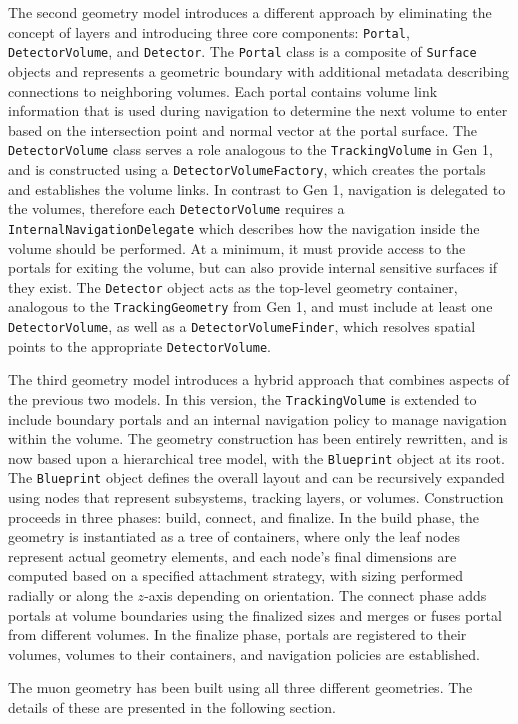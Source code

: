 The second geometry model introduces a different approach by eliminating the concept of layers and introducing three core components: \texttt{Portal}, \texttt{DetectorVolume}, and \texttt{Detector}. The \texttt{Portal} class is a composite of \texttt{Surface} objects and represents a geometric boundary with additional metadata describing connections to neighboring volumes. Each portal contains volume link information that is used during navigation to determine the next volume to enter based on the intersection point and normal vector at the portal surface. The \texttt{DetectorVolume} class serves a role analogous to the \texttt{TrackingVolume} in Gen 1, and is constructed using a \texttt{DetectorVolumeFactory}, which creates the portals and establishes the volume links. In contrast to Gen 1, navigation is delegated to the volumes, therefore each \texttt{DetectorVolume} requires a \texttt{InternalNavigationDelegate} which describes how the navigation inside the volume should be performed. At a minimum, it must provide access to the portals for exiting the volume, but can also provide internal sensitive surfaces if they exist. The \texttt{Detector} object acts as the top-level geometry container, analogous to the \texttt{TrackingGeometry} from Gen 1, and must include at least one \texttt{DetectorVolume}, as well as a \texttt{DetectorVolumeFinder}, which resolves spatial points to the appropriate \texttt{DetectorVolume}.

The third geometry model introduces a hybrid approach that combines aspects of the previous two models. In this version, the \texttt{TrackingVolume} is extended to include boundary portals and an internal navigation policy to manage navigation within the volume. The geometry construction has been entirely rewritten, and is now based upon a hierarchical tree model, with the \texttt{Blueprint} object at its root. The \texttt{Blueprint} object defines the overall layout and can be recursively expanded using nodes that represent subsystems, tracking layers, or volumes. Construction proceeds in three phases: build, connect, and finalize. In the build phase, the geometry is instantiated as a tree of containers, where only the leaf nodes represent actual geometry elements, and each node's final dimensions are computed based on a specified attachment strategy, with sizing performed radially or along the $z$-axis depending on orientation. The connect phase adds portals at volume boundaries using the finalized sizes and merges or fuses portal from different volumes. In the finalize phase, portals are registered to their volumes, volumes to their containers, and navigation policies are established.

The muon geometry has been built using all three different geometries. The details of these are presented in the following section.
